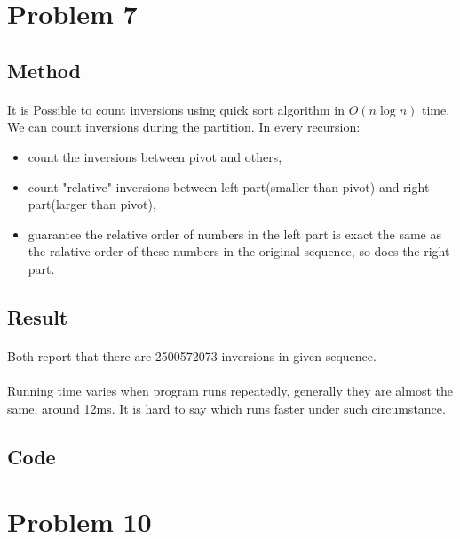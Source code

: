 \documentclass[]{article}
\begin{document}
    
        
    \section{Problem 7}
        \subsection*{Method}
            \paragraph{}It is Possible to count inversions using quick sort algorithm in $ O(n \log n) $ time. We can count inversions during the partition. In every recursion:
            \begin{itemize}
                \item count the inversions between pivot and others,
                \item count "relative" inversions between left part(smaller than pivot) and right part(larger than pivot),
                \item guarantee the relative order of numbers in the left part is exact the same as the ralative order of these numbers in the original sequence, so does the right part.
            \end{itemize}
        \subsection*{Result}
            \paragraph{} Both report that there are 2500572073 inversions in given sequence.
            \paragraph{} Running time varies when program runs repeatedly, generally they are almost the same, around 12ms. It is hard to say which runs faster under such circumstance.
        \subsection*{Code}
        
    \section{Problem 10}
\end{document}
